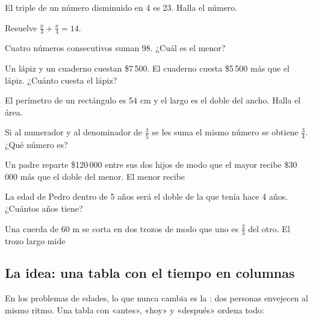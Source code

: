 \taller
{}
\begin{ejercicios}
\item El triple de un número disminuido en 4 es 23. Halla el número. 
\item Resuelve $\tfrac{x}{3} + \tfrac{x}{4} = 14$. 
\item Cuatro números consecutivos suman 98. ¿Cuál es el menor? 
\end{ejercicios}
\begin{ejercicios}
\item Un lápiz y un cuaderno cuestan \$7\,500. El cuaderno cuesta \$5\,500 más que el lápiz. ¿Cuánto cuesta el lápiz? 
\item El perímetro de un rectángulo es 54 cm y el largo es el doble del ancho. Halla el área. 
\item Si al numerador y al denominador de $\tfrac{3}{5}$ se les suma el mismo número se obtiene $\tfrac{3}{4}$. ¿Qué número es? 
\end{ejercicios}
\begin{ejercicios}
\item Un padre reparte \$120\,000 entre sus dos hijos de modo que el mayor recibe \$30\,000 más que el doble del menor. El menor recibe
\item La edad de Pedro dentro de 5 años será el doble de la que tenía hace 4 años. ¿Cuántos años tiene?
\item Una cuerda de 60 m se corta en dos trozos de modo que uno es $\tfrac23$ del otro. El trozo largo mide
\end{ejercicios}

\bitacora


\subsection{La idea: una tabla con el tiempo en columnas}
En los problemas de edades, lo que nunca cambia es la : dos personas envejecen al mismo
ritmo. Una tabla con «antes», «hoy» y «después» ordena todo:

